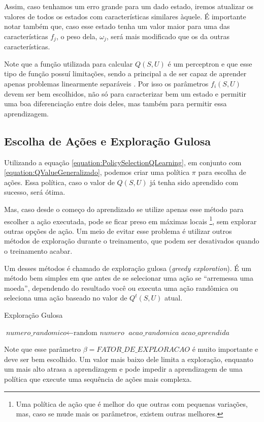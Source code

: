 Assim, caso tenhamos um erro grande para um dado estado, iremos atualizar os valores de todos os estados com características similares àquele. É importante notar também que, caso esse estado tenha um valor maior para uma das características $ f_j $, o peso dela, $ \omega_j $, será mais modificado que os da outras características.

Note que a função utilizada para calcular $ Q \left( S, U \right) $ é um perceptron e que esse tipo de função possuí limitações, sendo a principal a de ser capaz de aprender apenas problemas linearmente separáveis \cite{Haykin:1998:NNC:521706,priddy2005artificial}. Por isso os parâmetros $ f_i \left( S, U \right) $ devem ser bem escolhidos, não só para caracterizar bem um estado e permitir uma boa diferenciação entre dois deles, mas também para permitir essa aprendizagem.

\subsection{Escolha de Ações e Exploração Gulosa} \label{subsection:EscolhaDeAçõesExploraçãoGulosa}

Utilizando a equação \ref{equation:PolicySelectionQLearning}, em conjunto com \ref{equation:QValueGeneralizado}, podemos criar uma política $ \pi $ para escolha de ações. Essa política, caso o valor de $ Q \left( S, U \right) $ já tenha sido aprendido com sucesso, será ótima.

Mas, caso desde o começo do aprendizado se utilize apenas esse método para escolher a ação executada, pode se ficar preso em máximas locais%
\footnote{Uma política de ação que é melhor do que outras com pequenas variações, mas, caso se mude mais os parâmetros, existem outras melhores.%
}, sem explorar outras opções de ação. Um meio de evitar esse problema é utilizar outros métodos de exploração durante o treinamento, que podem ser desativados quando o treinamento acabar. 

Um desses métodos é chamado de exploração gulosa (\textit{greedy exploration}). É um método bem simples em que antes de se selecionar uma ação se ``arremessa uma moeda'', dependendo do resultado você ou executa uma ação randômica ou seleciona uma ação baseado no valor de $ Q^t \left( S, U \right) $ atual.

\begin{algorithm}[H]
	\caption{Exploração Gulosa} \label{euclid}
	\begin{algorithmic}[1]
			\State $\textit{numero\_randomico} \gets \text{random }\textit{numero}$
				\State \Return $\textit{acao\_randomica}$
			\Else
				\State \Return $\textit{acao\_aprendida}$
			\EndIf
		\EndProcedure
	\end{algorithmic}
\end{algorithm}

Note que esse parâmetro $ \beta = \textit{FATOR\_DE\_EXPLORACAO} $ é muito importante e deve ser bem escolhido. Um valor mais baixo dele limita a exploração, enquanto um mais alto atrasa a aprendizagem e pode impedir a aprendizagem de uma política que execute uma sequência de ações mais complexa.
